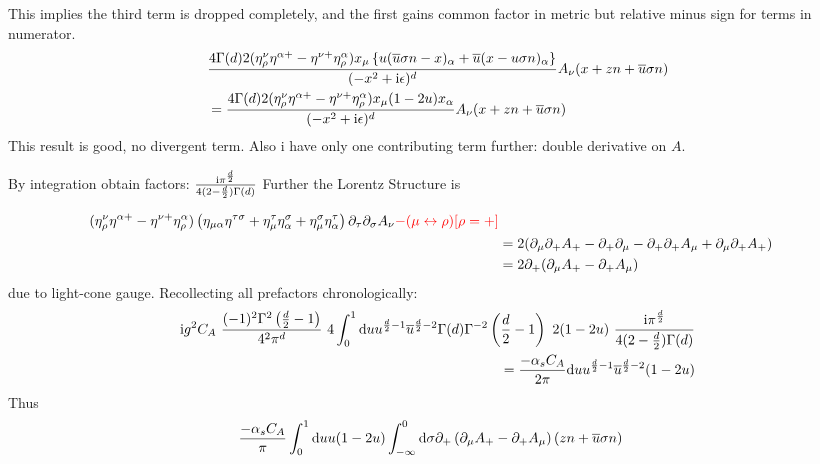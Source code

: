 This implies the third term is dropped completely, and the first gains common factor in metric but relative minus sign for terms in numerator. 
\begin{align}
&\frac{4\Gamma(d)2(\eta^{\nu}_\rho \eta^{\alpha + } - \eta^{\nu +} \eta^{\alpha}_\rho) x_\mu\left\{u (\overline u \sigma n -x )_\alpha  +\overline u (x - u\sigma n)_\alpha  \right\}}{(-x^2+\text{i}\epsilon)^{d}} A_{\nu}(x+zn+\overline u \sigma n)
\\
&=
\frac{4\Gamma(d)2(\eta^{\nu}_\rho \eta^{\alpha + } - \eta^{\nu +} \eta^{\alpha}_\rho) x_\mu(1-2u) x_\alpha }{(-x^2+\text{i}\epsilon)^{d}} A_{\nu}(x+zn+\overline u \sigma n)
\end{align}
This result is good, no divergent term. Also i have only one contributing term further: double derivative on $A$. 

By integration obtain factors: $\frac{\text{i} \pi^{\frac{d}{2}}}{4(2-\frac{d}{2})\Gamma(d)}$
Further the Lorentz Structure is

\begin{align}
(\eta^{\nu}_\rho \eta^{\alpha + } - \eta^{\nu +} \eta^{\alpha}_\rho)\left(\eta_{\mu\alpha}\eta^{\tau \sigma} + \eta_\mu^{\tau} \eta_\alpha^{\sigma} +\eta_\mu^{\sigma}\eta_{\alpha}^{\tau}\right)\partial_\tau \partial_\sigma A_\nu  {\color{red}- (\mu \leftrightarrow \rho)  [\rho = +]}
\\
&=
2(\partial_\mu \partial_+ A_+ - \partial_+\partial_\mu -\partial_+ \partial_+ A_\mu  + \partial_\mu \partial_+ A_+)
\\
&=
2\partial_+ (\partial_\mu A_+ - \partial_+ A_\mu)
\end{align} 
due to light-cone gauge.
Recollecting all prefactors chronologically:
\begin{align}
\text{i} g^2 C_A ~ \frac{(-1)^2\Gamma^2\left(\frac{d}{2}-1\right)}{4^2\pi^d} ~ 4\int_0^1 \text{d} u u^{\frac{d}{2}-1}\overline u^{\frac{d}{2}-2}\Gamma(d)\Gamma^{-2}\left(\frac{d}{2}-1\right)~2(1-2u)~
\frac{\text{i} \pi^{\frac{d}{2}}}{4(2-\frac{d}{2})\Gamma(d)}
\\
=
\frac{-\alpha_s C_A}{2\pi}\text{d} u u^{\frac{d}{2}-1}\overline u^{\frac{d}{2}-2}(1-2u)
\end{align}
Thus
\begin{align}
	&
	\frac{-\alpha_s C_A}{\pi}\int _0^1\text{d} u u (1-2u) \int_{-\infty}^0 \text{d} \sigma \partial_+ \left(\partial_\mu A_+ - \partial_+ A_\mu\right)(zn + \overline u \sigma n)
\end{align}

